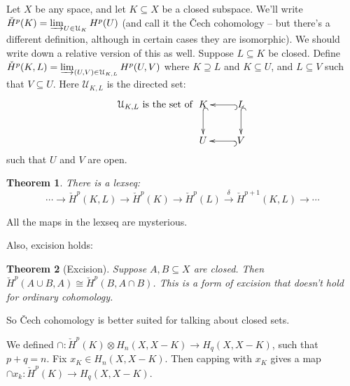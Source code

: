 \documentclass{amsart}
\theoremstyle{theorem}
\newtheorem{theorem}{Theorem}[section]
\theoremstyle{definition}
\newcommand\cHH{\check{H}}
\begin{document}
Let $X$ be any space, and let $K\subseteq X$ be a closed subspace. We'll write $\cHH^p(K)=\varinjlim_{U\in\mathcal{U}_K} H^p(U)$ (and call it the \v{C}ech cohomology -- but there's a different definition, although in certain cases they are isomorphic). We should write down a relative version of this as well. Suppose $L\subseteq K$ be closed. Define $\cHH^p(K,L)=\varinjlim_{(U,V)\in\mathcal{U}_{K,L}} H^p(U,V)$ where $K\supseteq L$ and $K\subseteq U$, and $L\subseteq V$ such that $V\subseteq U$. Here $\mathcal{U}_{K,L}$ is the directed set:
\begin{equation*}
\mathcal{U}_{K,L}\text{ is the set of }\xymatrix{K\ar@{^(->}[d] & L\ar@{^(->}[d]\ar@{^(->}[l] \\ U & V\ar@{^(->}[l]}
\end{equation*}
such that $U$ and $V$ are open.
\begin{theorem}
There is a lexseq:
\begin{equation*}
\cdots\to\cHH^p(K,L)\to\cHH^p(K)\to\cHH^p(L)\xrightarrow{\delta}\cHH^{p+1}(K,L)\to\cdots
\end{equation*}
\end{theorem}
All the maps in the lexseq are mysterious.

Also, excision holds:
\begin{theorem}[Excision]
Suppose $A,B\subseteq X$ are closed. Then $\cHH^p(A\cup B,A)\cong\cHH^p(B,A\cap B)$. This is a form of excision that doesn't hold for ordinary cohomology.
\end{theorem}
So \v{C}ech cohomology is better suited for talking about closed sets. 

We defined $\cap:\cHH^p(K)\otimes H_n(X,X-K)\to H_q(X,X-K)$, such that $p+q=n$. Fix $x_K\in H_n(X,X-K)$. Then capping with $x_K$ gives a map $\cap x_k:\cHH^p(K)\to H_q(X,X-K)$.
\end{document}

